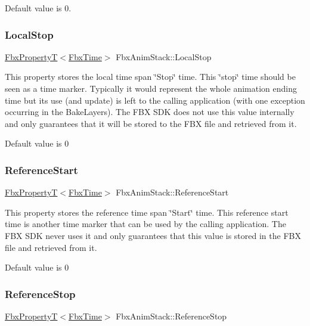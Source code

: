 Default value is 0. \mbox{\label{class_fbx_anim_stack_a07be87cbd6b3226be489c69b5466a72d}} 
\subsubsection{\texorpdfstring{Local\+Stop}{LocalStop}}
{\footnotesize\ttfamily \hyperlink{class_fbx_property_t}{Fbx\+PropertyT}$<$\hyperlink{class_fbx_time}{Fbx\+Time}$>$ Fbx\+Anim\+Stack\+::\+Local\+Stop}

This property stores the local time span \char`\"{}\+Stop\char`\"{} time. This \char`\"{}stop\char`\"{} time should be seen as a time marker. Typically it would represent the whole animation ending time but its use (and update) is left to the calling application (with one exception occurring in the Bake\+Layers). The F\+BX S\+DK does not use this value internally and only guarantees that it will be stored to the F\+BX file and retrieved from it.

Default value is 0 \mbox{\label{class_fbx_anim_stack_adeac4e2557e00ccd420eb9b790377e22}} 
\subsubsection{\texorpdfstring{Reference\+Start}{ReferenceStart}}
{\footnotesize\ttfamily \hyperlink{class_fbx_property_t}{Fbx\+PropertyT}$<$\hyperlink{class_fbx_time}{Fbx\+Time}$>$ Fbx\+Anim\+Stack\+::\+Reference\+Start}

This property stores the reference time span \char`\"{}\+Start\char`\"{} time. This reference start time is another time marker that can be used by the calling application. The F\+BX S\+DK never uses it and only guarantees that this value is stored in the F\+BX file and retrieved from it.

Default value is 0 \mbox{\label{class_fbx_anim_stack_a480a3b46ab895a740ee658e7022ec208}} 
\subsubsection{\texorpdfstring{Reference\+Stop}{ReferenceStop}}
{\footnotesize\ttfamily \hyperlink{class_fbx_property_t}{Fbx\+PropertyT}$<$\hyperlink{class_fbx_time}{Fbx\+Time}$>$ Fbx\+Anim\+Stack\+::\+Reference\+Stop}

